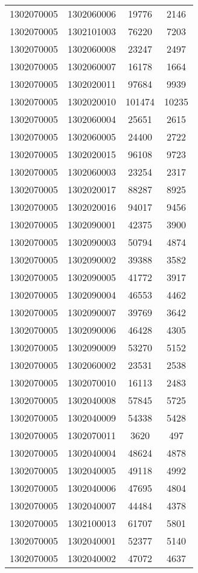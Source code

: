 \begin{longtable}[h]{llcc}
		1302070005 & 1302060006 & 19776 & 2146\\
		1302070005 & 1302101003 & 76220 & 7203\\
		1302070005 & 1302060008 & 23247 & 2497\\
		1302070005 & 1302060007 & 16178 & 1664\\
		1302070005 & 1302020011 & 97684 & 9939\\
		1302070005 & 1302020010 & 101474 & 10235\\
		1302070005 & 1302060004 & 25651 & 2615\\
		1302070005 & 1302060005 & 24400 & 2722\\
		1302070005 & 1302020015 & 96108 & 9723\\
		1302070005 & 1302060003 & 23254 & 2317\\
		1302070005 & 1302020017 & 88287 & 8925\\
		1302070005 & 1302020016 & 94017 & 9456\\
		1302070005 & 1302090001 & 42375 & 3900\\
		1302070005 & 1302090003 & 50794 & 4874\\
		1302070005 & 1302090002 & 39388 & 3582\\
		1302070005 & 1302090005 & 41772 & 3917\\
		1302070005 & 1302090004 & 46553 & 4462\\
		1302070005 & 1302090007 & 39769 & 3642\\
		1302070005 & 1302090006 & 46428 & 4305\\
		1302070005 & 1302090009 & 53270 & 5152\\
		1302070005 & 1302060002 & 23531 & 2538\\
		1302070005 & 1302070010 & 16113 & 2483\\
		1302070005 & 1302040008 & 57845 & 5725\\
		1302070005 & 1302040009 & 54338 & 5428\\
		1302070005 & 1302070011 & 3620 & 497\\
		1302070005 & 1302040004 & 48624 & 4878\\
		1302070005 & 1302040005 & 49118 & 4992\\
		1302070005 & 1302040006 & 47695 & 4804\\
		1302070005 & 1302040007 & 44484 & 4378\\
		1302070005 & 1302100013 & 61707 & 5801\\
		1302070005 & 1302040001 & 52377 & 5140\\
		1302070005 & 1302040002 & 47072 & 4637\\

\end{longtable}
